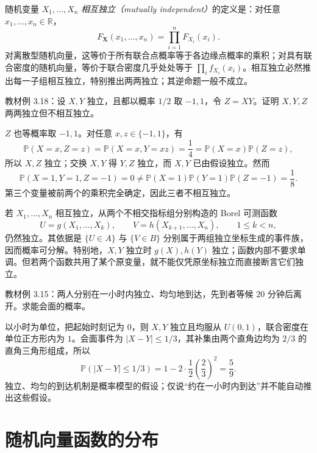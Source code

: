 随机变量 $X_1,\ldots,X_n$ \emph{相互独立（mutually independent）}的定义是：对任意 $x_1,\ldots,x_n\in\mathbb R$，
\[
  F_{\boldsymbol X}(x_1,\ldots,x_n)=\prod_{i=1}^nF_{X_i}(x_i).
\]
对离散型随机向量，这等价于所有联合点概率等于各边缘点概率的乘积；对具有联合密度的随机向量，等价于联合密度几乎处处等于 $\prod_i f_{X_i}(x_i)$。相互独立必然推出每一子组相互独立，特别推出两两独立；其逆命题一般不成立。

\begin{example}
\label{ex:study-ch3-pairwise-not-mutual}
教材例 3.18：设 $X,Y$ 独立，且都以概率 $1/2$ 取 $-1,1$，令 $Z=XY$。证明 $X,Y,Z$ 两两独立但不相互独立。
\end{example}

\begin{solve}
$Z$ 也等概率取 $-1,1$。对任意 $x,z\in\{-1,1\}$，有
\[
  \mathbb P(X=x,Z=z)=\mathbb P(X=x,Y=xz)=\frac14
  =\mathbb P(X=x)\mathbb P(Z=z),
\]
所以 $X,Z$ 独立；交换 $X,Y$ 得 $Y,Z$ 独立，而 $X,Y$ 已由假设独立。然而
\[
  \mathbb P(X=1,Y=1,Z=-1)=0
  \ne\mathbb P(X=1)\mathbb P(Y=1)\mathbb P(Z=-1)=\frac18.
\]
第三个变量被前两个的乘积完全确定，因此三者不相互独立。
\end{solve}

若 $X_1,\ldots,X_n$ 相互独立，从两个不相交指标组分别构造的 Borel 可测函数
\[
  U=g(X_1,\ldots,X_k),\qquad
  V=h(X_{k+1},\ldots,X_n),\qquad1\le k<n,
\]
仍然独立。其依据是 $\{U\in A\}$ 与 $\{V\in B\}$ 分别属于两组独立坐标生成的事件族，因而概率可分解。特别地，$X,Y$ 独立时 $g(X),h(Y)$ 独立；函数内部不要求单调。但若两个函数共用了某个原变量，就不能仅凭原坐标独立而直接断言它们独立。

\begin{example}
\label{ex:study-ch3-meeting-probability}
教材例 3.15：两人分别在一小时内独立、均匀地到达，先到者等候 $20$ 分钟后离开。求能会面的概率。
\end{example}

\begin{solve}
以小时为单位，把起始时刻记为 $0$，则 $X,Y$ 独立且均服从 $U(0,1)$，联合密度在单位正方形内为 $1$。会面事件为 $|X-Y|\le1/3$，其补集由两个直角边均为 $2/3$ 的直角三角形组成，所以
\[
  \mathbb P(|X-Y|\le1/3)=1-2\cdot\frac12\left(\frac23\right)^2=\frac59.
\]
独立、均匀的到达机制是概率模型的假设；仅说“约在一小时内到达”并不能自动推出这些假设。
\end{solve}

\section{随机向量函数的分布}
\label{sec:study-vector-transformations}

